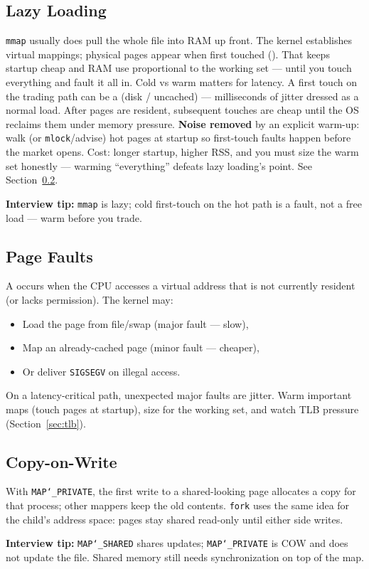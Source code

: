 \subsection{Lazy Loading}
\label{subsec:lazy-loading}
\texttt{mmap} usually does  pull the whole file into RAM up front. The kernel 
establishes virtual mappings; physical pages appear when first touched (). 
That keeps startup cheap and RAM use proportional to the working set --- until you touch 
everything and fault it all in.
\newline
Cold vs warm matters for latency. A first touch on the trading path can be a 
 (disk / uncached) --- milliseconds of jitter dressed as a 
normal load. After pages are resident, subsequent touches are cheap until the OS reclaims 
them under memory pressure.
\newline
\textbf{Noise removed} by an explicit warm-up: walk (or \texttt{mlock}/advise) hot pages at 
startup so first-touch faults happen before the market opens. Cost: longer startup, higher 
RSS, and you must size the warm set honestly --- warming ``everything'' defeats lazy loading's 
point. See Section~\ref{subsec:page-faults}.
\par\noindent\textbf{Interview tip:} \texttt{mmap} is lazy; cold first-touch on the hot path is a 
fault, not a free load --- warm before you trade.

\subsection{Page Faults}
\label{subsec:page-faults}
A  occurs when the CPU accesses a virtual address that is not currently 
resident (or lacks permission). The kernel may:
\begin{itemize}
    \item Load the page from file/swap (major fault --- slow),
    \item Map an already-cached page (minor fault --- cheaper),
    \item Or deliver \texttt{SIGSEGV} on illegal access.
\end{itemize}
On a latency-critical path, unexpected major faults are jitter. Warm important maps 
(touch pages at startup), size for the working set, and watch TLB pressure 
(Section~\ref{sec:tlb}).

\subsection{Copy-on-Write}
\label{subsec:copy-on-write}
With \texttt{MAP\char`_PRIVATE}, the first write to a shared-looking page allocates a 
 copy for that process; other mappers keep the old contents. 
\texttt{fork} uses the same idea for the child's address space: pages stay shared read-only 
until either side writes.
\par\noindent\textbf{Interview tip:} \texttt{MAP\char`_SHARED} shares updates; \texttt{MAP\char`_PRIVATE} is COW and 
does not update the file. Shared memory still needs synchronization on top of the map.
